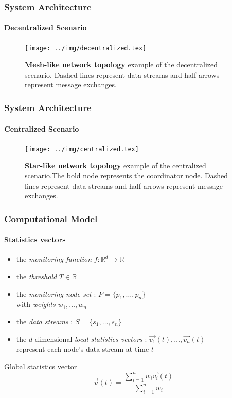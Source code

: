 \documentclass[hyperref={pdfpagelabels=false}]{beamer}
\begin{document}
\begin{frame} \frametitle{System Architecture} \framesubtitle{Decentralized Scenario}
\begin{figure}[H]
\centering
\vspace{-0.2cm}
\texttt{[image: ../img/decentralized.tex]}
\caption{\textbf{Mesh-like network topology} example of the decentralized scenario. Dashed lines represent data streams and half arrows represent message exchanges.} 
\end{figure}
\end{frame}

\begin{frame} \frametitle{System Architecture} \framesubtitle{Centralized Scenario}
\begin{figure}[H]
\centering
\vspace{-1cm}
\texttt{[image: ../img/centralized.tex]}
\caption{\textbf{Star-like network topology} example of the centralized scenario.The bold node represents the coordinator node. Dashed lines represent data streams and half arrows represent message exchanges.} 
\end{figure}
\end{frame}

\begin{frame} \frametitle{Computational Model}\framesubtitle{Statistics vectors}

\begin{itemize}
\item the \emph{monitoring function} $f:\mathbb{R}^d \to \mathbb{R}$
\item the \emph{threshold} $T \in \mathbb{R}$
\item the \emph{monitoring node set} : $P=\{p_1, \dots, p_n\}$\\\quad with \emph{weights} $w_1, \dots, w_n$
\item the \emph{data streams} : $S=\{s_1, \dots, s_n\}$
\item the $d$-dimensional \emph{local statistics vectors} : $\vec{v_1}(t), \dots, \vec{v_n}(t)$\\\quad represent each node's data stream at time $t$
\end{itemize}
\begin{block}{Global statistics vector}
\vspace{0.2cm}
\begin{equation}
\vec{v}(t)=\frac{\sum_{i=1}^n{w_i\vec{v_i}(t)}}{\sum_{i=1}^n{w_i}}
\label{form:globalStatsVector}
\end{equation}
\vspace{0.2cm}
\end{block}
\end{frame}
\end{document}

